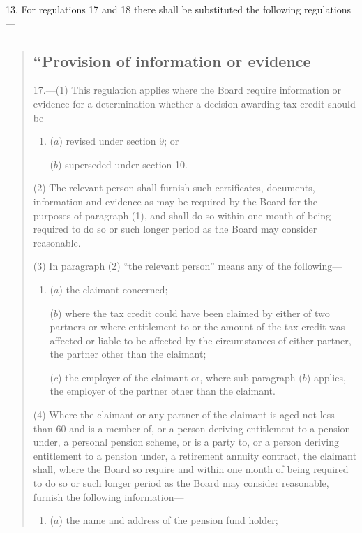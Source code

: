 \documentclass[12pt,a4paper]{article}
\begin{document}
13.  For regulations 17 and 18 there shall be substituted the following regulations—
\begin{quotation}
\subsection*{“Provision of information or evidence}

17.---(1)  This regulation applies where the Board require information or evidence for a determination whether a decision awarding tax credit should be—
\begin{enumerate}\item[]
($a$) revised under section 9; or

($b$) superseded under section 10.
\end{enumerate}

(2) The relevant person shall furnish such certificates, documents, information and evidence as may be required by the Board for the purposes of paragraph (1), and shall do so within one month of being required to do so or such longer period as the Board may consider reasonable.

(3) In paragraph (2) “the relevant person” means any of the following—
\begin{enumerate}\item[]
($a$) the claimant concerned;

($b$) where the tax credit could have been claimed by either of two partners or where entitlement to or the amount of the tax credit was affected or liable to be affected by the circumstances of either partner, the partner other than the claimant;

($c$) the employer of the claimant or, where sub-paragraph ($b$)  applies, the employer of the partner other than the claimant.
\end{enumerate}

(4) Where the claimant or any partner of the claimant is aged not less than 60 and is a member of, or a person deriving entitlement to a pension under, a personal pension scheme, or is a party to, or a person deriving entitlement to a pension under, a retirement annuity contract, the claimant shall, where the Board so require and within one month of being required to do so or such longer period as the Board may consider reasonable, furnish the following information—
\begin{enumerate}\item[]
($a$) the name and address of the pension fund holder;


\end{enumerate}
\end{quotation}
\end{document}
